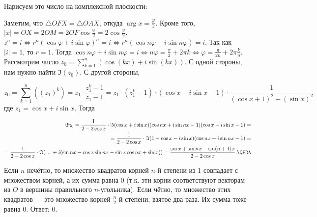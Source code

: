 \documentclass[12pt,a4paper]{article}
\begin{document}

\vskip20pt

\z Нарисуем это число на комплексной плоскости:


Заметим, что $\triangle OFX=\triangle OAX$, откуда $\arg x=\frac{\varphi}{2}$. Кроме того, $|x|=OX=2OM=2OF\cos \frac{\varphi}{2}=2\cos \frac{\varphi}{2}$.\QEDA\\

\z $z^n=i\iff r^n(\cos\varphi+i\sin\varphi)^n=i\iff r^n(\cos n\varphi+i\sin n\varphi)=i$. Так как $|i|=1$, то $r=1$. Тогда $\cos n\varphi+i\sin n\varphi=i\iff n\varphi=\frac{\pi}{2}+2\pi k\iff \varphi=\frac{\pi}{2n}+2\pi \frac{k}{n}$.\QEDA\\

\z Рассмотрим число $z_0=\sum_{k=1}^n(\cos(kx)+i\sin(kx))$. С одной стороны, нам нужно найти $\Im(z_0)$. С другой стороны,

\begin{equation*}
	z_0=\sum_{k=1}^n((z_1)^k)=z_1\cdot \frac{z_1^k-1}{z_1-1}=z_1\cdot (z_1^k-1)\cdot (\cos x-i\sin x-1)\cdot \frac1{(\cos x+1)^2+(\sin x)^2}
\end{equation*}
где $z_1=\cos x+i\sin x$. Тогда

\begin{align*}
	\Im z_0=\frac{1}{2-2\cos x}\cdot \Im(\cos x+i\sin x)(\cos nx+i\sin nx-1)(\cos x-i\sin x-1)=\\
	=\frac{1}{2-2\cos x}\cdot\Im (1-\cos x-i\sin x)(\cos nx+i\sin nx-1)=\\
	=\frac{1}{2-2\cos x}\cdot\Im(\ldots +i(\sin nx-\cos x\sin nx-\sin x\cos nx+\sin x))=\frac{\sin x+\sin nx-\sin(n+1)x}{2-2\cos x}.\QEDA
\end{align*}

\z Если $n$ нечётно, то множество квадратов корней $n$-й степени из 1 совпадает с множеством корней, а их сумма равна 0 (т.к. эти корни соответствуют векторам из $O$ в вершины правильного $n$-угольника). Если чётно, то множество этих квадратов --- это множество корней $\frac{n}{2}$-й степени, взятое два раза. Их сумма тоже равна 0. Ответ: 0.\QEDA\\
\end{document}
